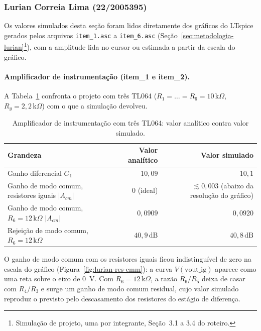 \documentclass[11pt,a4paper]{article}
\begin{document}

\subsubsection{Lurian Correia Lima (22/2005395)}

Os valores simulados desta seção foram lidos diretamente dos gráficos do LTspice gerados pelos arquivos \texttt{item\_1.asc} a \texttt{item\_6.asc} (Seção~\ref{sec:metodologia-lurian}\footnote{Simulação de projeto, uma por integrante, Seção~3.1 a 3.4 do roteiro.}), com a amplitude lida no cursor ou estimada a partir da escala do gráfico.

\paragraph{Amplificador de instrumentação (item\_1 e item\_2).} A Tabela~\ref{tab:lurian-instrumentacao} confronta o projeto com três TL064 (\(R_1=\dots=R_6=10\,\text{k}\Omega\), \(R_g=2{,}2\,\text{k}\Omega\)) com o que a simulação devolveu.

\begin{table}[H]
\centering
\caption{Amplificador de instrumentação com três TL064: valor analítico contra valor simulado.}
\label{tab:lurian-instrumentacao}
\begin{tabular}{@{}lrr@{}}
\toprule
\textbf{Grandeza} & \textbf{Valor analítico} & \textbf{Valor simulado} \\
\midrule
Ganho diferencial \(G_1\) & \(10{,}09\) & \(10{,}1\) \\
Ganho de modo comum, resistores iguais \(|A_{cm}|\) & \(0\) (ideal) & \(\lesssim 0{,}003\) (abaixo da resolução do gráfico) \\
Ganho de modo comum, \(R_6=12\,\text{k}\Omega\) \(|A_{cm}|\) & \(0{,}0909\) & \(0{,}0920\) \\
Rejeição de modo comum, \(R_6=12\,\text{k}\Omega\) & \(40{,}9\,\text{dB}\) & \(40{,}8\,\text{dB}\) \\
\bottomrule
\end{tabular}
\end{table}

O ganho de modo comum com os resistores iguais ficou indistinguível de zero na escala do gráfico (Figura~\ref{fig:lurian-res-cmm}): a curva \(V(\text{vout\_ig})\) aparece como uma reta sobre o eixo de \SI{0}{\volt}. Com \(R_6=12\,\text{k}\Omega\), a razão \(R_6/R_5\) deixa de casar com \(R_4/R_3\) e surge um ganho de modo comum residual, cujo valor simulado reproduz o previsto pelo descasamento dos resistores do estágio de diferença.
\end{document}

